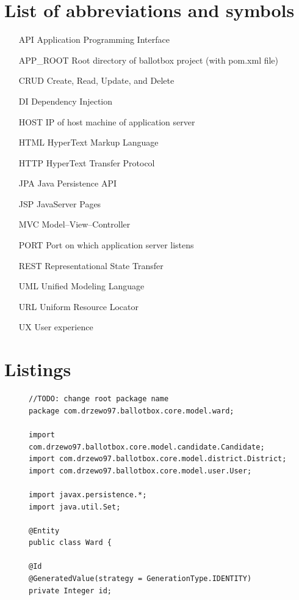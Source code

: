 \documentclass[a4paper,twoside,12pt]{book}
\begin{document}
\begin{appendices} 

\chapter*{List of abbreviations and symbols}

\begin{itemize}
  \item[API] Application Programming Interface
  \item[APP\_ROOT] Root directory of ballotbox project (with pom.xml file)
  \item[CRUD] Create, Read, Update, and Delete 
  \item[DI] Dependency Injection 
  \item[HOST] IP of host machine of application server  
  \item[HTML] HyperText Markup Language
  \item[HTTP] HyperText Transfer Protocol
  \item[JPA] Java Persistence API
  \item[JSP] JavaServer Pages
  \item[MVC] Model--View--Controller
  \item[PORT] Port on which application server listens
  \item[REST] Representational State Transfer
  \item[UML] Unified Modeling Language
  \item[URL] Uniform Resource Locator
  \item[UX] User experience 
\end{itemize}


\chapter*{Listings}
\begin{figure}
  \centering
    \begin{lstlisting}
//TODO: change root package name
package com.drzewo97.ballotbox.core.model.ward;

import com.drzewo97.ballotbox.core.model.candidate.Candidate;
import com.drzewo97.ballotbox.core.model.district.District;
import com.drzewo97.ballotbox.core.model.user.User;

import javax.persistence.*;
import java.util.Set;

@Entity
public class Ward {
          
@Id
@GeneratedValue(strategy = GenerationType.IDENTITY)
private Integer id;
          

\end{lstlisting}
\end{figure}
\end{appendices}
\end{document}

